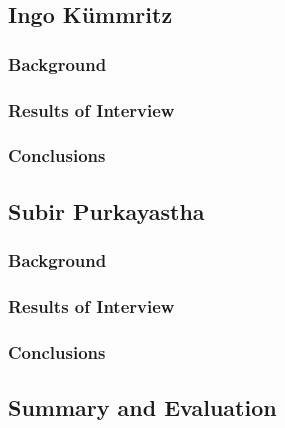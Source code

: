 \subsection{Ingo K\"ummritz}
\subsubsection{Background}
\subsubsection{Results of Interview}
\subsubsection{Conclusions}
\subsection{Subir Purkayastha}
\subsubsection{Background}
\subsubsection{Results of Interview}
\subsubsection{Conclusions}


\subsection{Summary and Evaluation}
